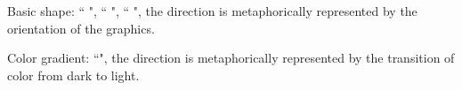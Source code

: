 \documentclass[review,journal]{vgtc}         %
\begin{document}
 Basic shape: ``  ", ``  ", ``  ", the direction is metaphorically represented by the orientation of the graphics.

 Color gradient: ``", the direction is metaphorically represented by the transition of color from dark to light.
\end{document}
